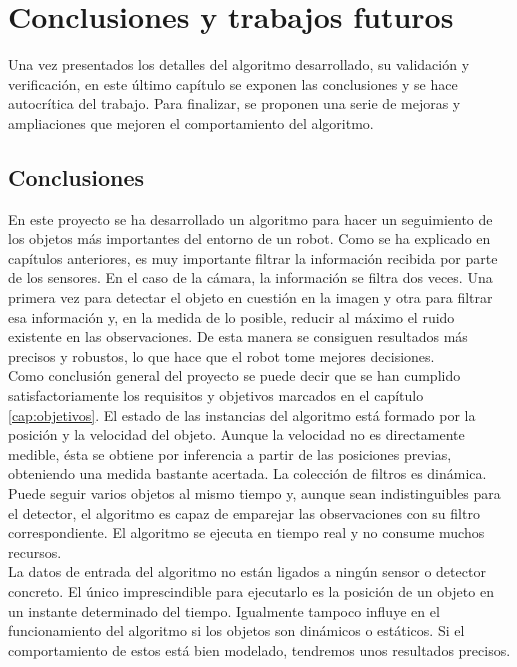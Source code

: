 \chapter{Conclusiones y trabajos futuros}
\label{cap:conclusiones}

Una vez presentados los detalles del algoritmo desarrollado, su validación y verificación, en este último capítulo se exponen las conclusiones y se hace autocrítica del trabajo. Para finalizar, se proponen una serie de mejoras y ampliaciones que mejoren el comportamiento del algoritmo.

\section{Conclusiones}
\label{sec:conclusiones}

En este proyecto se ha desarrollado un algoritmo para hacer un seguimiento de los objetos más importantes del entorno de un robot. Como se ha explicado en capítulos anteriores, es muy importante filtrar la información recibida por parte de los sensores. En el caso de la cámara, la información se filtra dos veces. Una primera vez para detectar el objeto en cuestión en la imagen y otra para filtrar esa información y, en la medida de lo posible, reducir al máximo el ruido existente en las observaciones. De esta manera se consiguen resultados más precisos y robustos, lo que hace que el robot tome mejores decisiones. \\

Como conclusión general del proyecto se puede decir que se han cumplido satisfactoriamente los requisitos y objetivos marcados en el capítulo \ref{cap:objetivos}. El estado de las instancias del algoritmo está formado por la posición y la velocidad del objeto. Aunque la velocidad no es directamente medible, ésta se obtiene por inferencia a partir de las posiciones previas, obteniendo una medida bastante acertada. La colección de filtros es dinámica. Puede seguir varios objetos al mismo tiempo y, aunque sean indistinguibles para el detector, el algoritmo es capaz de emparejar las observaciones con su filtro correspondiente. El algoritmo se ejecuta en tiempo real y no consume muchos recursos. \\

La datos de entrada del algoritmo no están ligados a ningún sensor o detector concreto. El único imprescindible para ejecutarlo es la posición de un objeto en un instante determinado del tiempo. Igualmente tampoco influye en el funcionamiento del algoritmo si los objetos son dinámicos o estáticos. Si el comportamiento de estos está bien modelado, tendremos unos resultados precisos. \\

